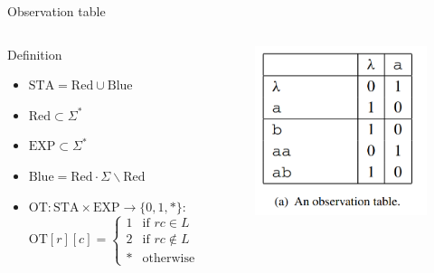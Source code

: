 \documentclass[aspectratio=169,xcolor=dvipsnames]{beamer}
\begin{document}
\begin{frame}[t]{Observation table}
{\begin{columns}
\begin{block}{Definition}
    \begin{itemize}
        \item $\text{STA} = \text{Red} \cup \text{Blue}$
        \item $\text{Red} \subset \Sigma^*$
        \item $\text{EXP} \subset \Sigma^*$
        \item $\text{Blue} = \text{Red} \cdot \Sigma \backslash \text{Red}$
        \item $\text{OT}: \text{STA} \times \text{EXP} \rightarrow \{0, 1, *\}$: \\
        $\text{OT}[r][c] = 
        \begin{cases}
        1 & \text{if } rc \in L \\
        2 & \text{if } rc \notin L \\
        * & \text{otherwise}
        \end{cases}$
    \end{itemize}
    \end{block}

    \begin{figure}
        \centering
        \includegraphics[width=0.9\linewidth]{images/fig13_1a.png}
    \end{figure}

\end{columns}
}

\end{frame}
\end{document}
